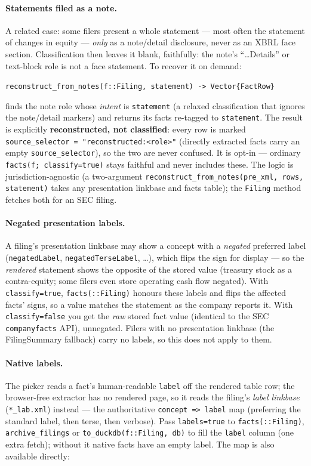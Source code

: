 \documentclass[11pt,a4paper]{report}
\newcommand{\sig}[1]{\medskip\noindent\texttt{#1}\par\medskip}
\begin{document}
\paragraph{Statements filed as a note.} A related case: some filers present a whole statement --- most
often the statement of changes in equity --- \emph{only} as a note/detail disclosure, never as an XBRL
face section. Classification then leaves it blank, faithfully: the note's ``\ldots Details'' or
text-block role is not a face statement. To recover it on demand:

\sig{reconstruct\_from\_notes(f::Filing, statement) -> Vector\{FactRow\}}

\noindent finds the note role whose \emph{intent} is \texttt{statement} (a relaxed classification that
ignores the note/detail markers) and returns its facts re-tagged to \texttt{statement}. The result is
explicitly \textbf{reconstructed, not classified}: every row is marked \texttt{source\_selector =
"reconstructed:<role>"} (directly extracted facts carry an empty \texttt{source\_selector}), so the two
are never confused. It is opt-in --- ordinary \texttt{facts(f; classify=true)} stays faithful and never
includes these. The logic is jurisdiction-agnostic (a two-argument
\texttt{reconstruct\_from\_notes(pre\_xml, rows, statement)} takes any presentation linkbase and facts
table); the \texttt{Filing} method fetches both for an SEC filing.

\paragraph{Negated presentation labels.} A filing's presentation linkbase may show a concept with a
\emph{negated} preferred label (\texttt{negatedLabel}, \texttt{negatedTerseLabel}, \ldots), which flips
the sign for display --- so the \emph{rendered} statement shows the opposite of the stored value
(treasury stock as a contra-equity; some filers even store operating cash flow negated). With
\texttt{classify=true}, \texttt{facts(::Filing)} honours these labels and flips the affected facts'
signs, so a value matches the statement as the company reports it. With \texttt{classify=false} you get
the \emph{raw} stored fact value (identical to the SEC \texttt{companyfacts} API), unnegated. Filers with
no presentation linkbase (the FilingSummary fallback) carry no labels, so this does not apply to them.

\paragraph{Native labels.} The picker reads a fact's human-readable \texttt{label} off the
rendered table row; the browser-free extractor has no rendered page, so it reads the filing's
\emph{label linkbase} (\texttt{*\_lab.xml}) instead --- the authoritative \texttt{concept => label}
map (preferring the standard label, then terse, then verbose). Pass \texttt{labels=true} to
\texttt{facts(::Filing)}, \texttt{archive\_filings} or \texttt{to\_duckdb(f::Filing, db)} to fill
the \texttt{label} column (one extra fetch); without it native facts have an empty label. The map
is also available directly:
\end{document}

